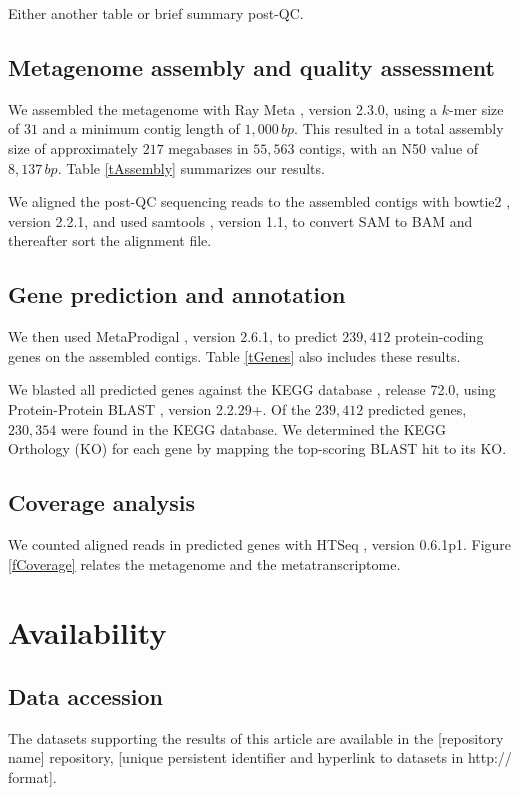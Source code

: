 \documentclass{bmcart}
\begin{document}
Either another table or brief summary post-QC.
%
\subsection*{Metagenome assembly and quality assessment}
We assembled the metagenome with Ray Meta \cite{RayMeta}, version 2.3.0, using a $k$-mer size of $31$ and a minimum contig length of $1,000\,bp$.
This resulted in a total assembly size of approximately $217$ megabases in $55,563$ contigs, with an N50 value of $8,137\,bp$.
Table \ref{tAssembly} summarizes our results.

We aligned the post-QC sequencing reads to the assembled contigs with bowtie2 \cite{Bowtie2}, version 2.2.1, and used samtools \cite{Samtools}, version 1.1, to convert SAM to BAM and thereafter sort the alignment file.
%
\subsection*{Gene prediction and annotation}
We then used MetaProdigal \cite{MetaProdigal}, version 2.6.1, to predict $239,412$ protein-coding genes on the assembled contigs. Table \ref{tGenes} also includes these results.

We blasted all predicted genes against the KEGG database \cite{KeggDB}, release 72.0, using Protein-Protein BLAST \cite{BlastPlus}, version 2.2.29+. 
Of the $239,412$ predicted genes, $230,354$ were found in the KEGG database.
We determined the KEGG Orthology (KO) for each gene by mapping the top-scoring BLAST hit to its KO.

\subsection*{Coverage analysis}
We counted aligned reads in predicted genes with HTSeq \cite{HTSeq}, version 0.6.1p1.
Figure \ref{fCoverage} relates the metagenome and the metatranscriptome.
%
\section*{Availability}
\subsection*{Data accession}
The datasets supporting the results of this article are available in the [repository name] repository, [unique persistent identifier and hyperlink to datasets in http:// format].
%
\end{document}
